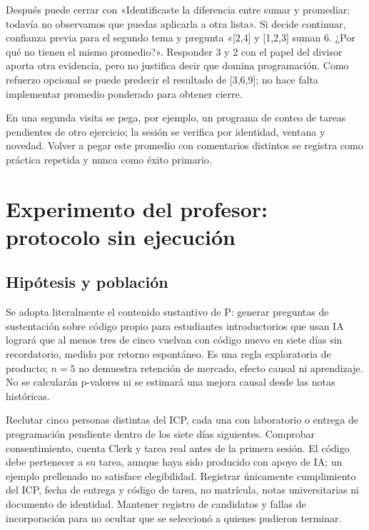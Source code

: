 \documentclass[11pt,a4paper]{report}
\begin{document}
Después puede cerrar con «Identificaste la diferencia entre sumar y promediar; todavía no observamos que puedas aplicarla a otra lista». Si decide continuar, confianza previa para el segundo tema y pregunta «[2,4] y [1,2,3] suman 6. ¿Por qué no tienen el mismo promedio?». Responder 3 y 2 con el papel del divisor aporta otra evidencia, pero no justifica decir que domina programación. Como refuerzo opcional se puede predecir el resultado de [3,6,9]; no hace falta implementar promedio ponderado para obtener cierre.

En una segunda visita se pega, por ejemplo, un programa de conteo de tareas pendientes de otro ejercicio; la sesión se verifica por identidad, ventana y novedad. Volver a pegar este promedio con comentarios distintos se registra como práctica repetida y nunca como éxito primario.

\chapter{Experimento del profesor: protocolo sin ejecución}
\label{ch:experimento}
\section{Hipótesis y población}
Se adopta literalmente el contenido sustantivo de P: generar preguntas de sustentación sobre código propio para estudiantes introductorios que usan IA logrará que al menos tres de cinco vuelvan con código nuevo en siete días sin recordatorio, medido por retorno espontáneo. Es una regla exploratoria de producto; \(n=5\) no demuestra retención de mercado, efecto causal ni aprendizaje. No se calcularán p-valores ni se estimará una mejora causal desde las notas históricas.

Reclutar cinco personas distintas del ICP, cada una con laboratorio o entrega de programación pendiente dentro de los siete días siguientes. Comprobar consentimiento, cuenta Clerk y tarea real antes de la primera sesión. El código debe pertenecer a su tarea, aunque haya sido producido con apoyo de IA; un ejemplo prellenado no satisface elegibilidad. Registrar únicamente cumplimiento del ICP, fecha de entrega y código de tarea, no matrícula, notas universitarias ni documento de identidad. Mantener registro de candidatos y fallas de incorporación para no ocultar que se seleccionó a quienes pudieron terminar.
\end{document}
